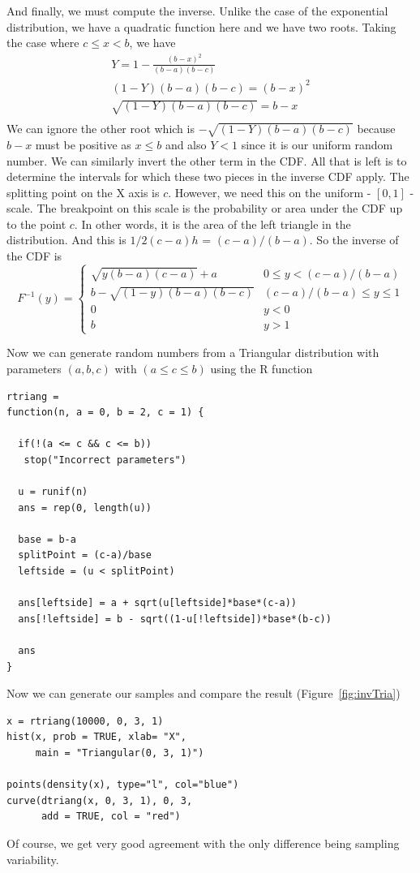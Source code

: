 And finally, we must compute the inverse.  Unlike the case of the
exponential distribution, we have a quadratic function here and we
have two roots.
Taking the case where $c \le x < b$, we have
\begin{eqnarray*}
  Y = 1 - \frac{(b-x)^2}{(b-a)(b-c)} \\
  (1 - Y)(b-a)(b-c) = (b-x)^2 \\
  \sqrt{(1 - Y)(b-a)(b-c)} = b - x \\
\end{eqnarray*}
We can ignore the other root which is $-\sqrt{(1 - Y)(b-a)(b-c)}$
because $b - x$ must be positive as $x \le b$ and also $Y < 1$ since
it is our uniform random number.  We can similarly invert the other
term in the CDF.  All that is left is to determine the
intervals for which these two pieces in the inverse CDF apply.  The
splitting point on the X axis is $c$.  However, we need this on the
uniform - $[0,1]$ - scale.  The breakpoint on this scale is the
probability or area under the CDF up to the point $c$.
In other words, it is the area of the left triangle in 
the distribution. And this is
$1/2 (c-a) h$  = $(c-a)/(b-a)$. So the 
inverse of the CDF is 
$$
  F^{-1}(y) =
  \begin{cases}
    \sqrt{y(b-a)(c-a)} + a &  0 \le y < (c-a)/(b-a)\\
    b - \sqrt{(1 - y)(b-a)(b-c)} & (c-a)/(b-a) \le y \le 1 \\
    0 & y < 0 \\
    b & y > 1
  \end{cases}
$$

Now we can generate random numbers from a Triangular
distribution with parameters $(a, b, c)$ with $(a \le c \le b)$
using the R function
\begin{verbatim}
rtriang =
function(n, a = 0, b = 2, c = 1) {

  if(!(a <= c && c <= b)) 
   stop("Incorrect parameters")

  u = runif(n)
  ans = rep(0, length(u))
    
  base = b-a
  splitPoint = (c-a)/base
  leftside = (u < splitPoint)

  ans[leftside] = a + sqrt(u[leftside]*base*(c-a))
  ans[!leftside] = b - sqrt((1-u[!leftside])*base*(b-c)) 

  ans
}
\end{verbatim}

Now we can generate our samples and compare the result (Figure~\ref{fig:invTria})
\begin{verbatim}
x = rtriang(10000, 0, 3, 1)
hist(x, prob = TRUE, xlab= "X",
     main = "Triangular(0, 3, 1)")

points(density(x), type="l", col="blue")
curve(dtriang(x, 0, 3, 1), 0, 3, 
      add = TRUE, col = "red")
\end{verbatim}
Of course,  we get very good agreement with 
the only difference being sampling variability.

